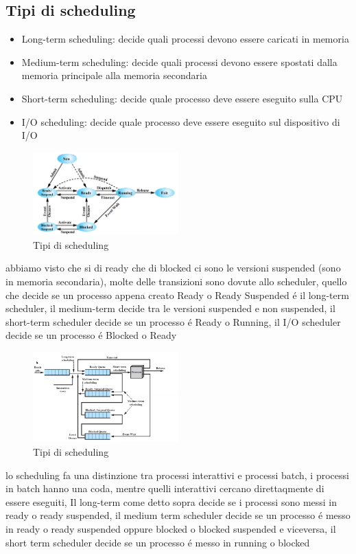 \documentclass[11pt]{article}
\begin{document}
    \subsection{Tipi di scheduling}
    \begin{itemize}
        \item Long-term scheduling: decide quali processi devono essere caricati in memoria
        \item Medium-term scheduling: decide quali processi devono essere spostati dalla memoria principale alla memoria secondaria
        \item Short-term scheduling: decide quale processo deve essere eseguito sulla CPU
        \item I/O scheduling: decide quale processo deve essere eseguito sul dispositivo di I/O
    \end{itemize}
    \begin{figure}[H]
        \centering
        \includegraphics[width=0.5\textwidth]{immagini/7State}
        \caption{Tipi di scheduling}
    \end{figure}
    abbiamo visto che si di ready che di blocked ci sono le versioni suspended (sono in memoria secondaria), molte
    delle transizioni sono dovute allo scheduler, quello che decide se un processo appena creato Ready o Ready Suspended
    é il long-term scheduler, il medium-term decide tra le versioni suspended e non suspended, il short-term scheduler
    decide se un processo é Ready o Running, il I/O scheduler decide se un processo é Blocked o Ready
    \begin{figure}[H]
        \centering
        \includegraphics[width=0.5\textwidth]{immagini/implementazioneScheduling}
        \caption{Tipi di scheduling}
    \end{figure}
    lo scheduling fa una distinzione tra processi interattivi e processi batch, i processi in batch hanno una coda, mentre
    quelli interattivi cercano direttaqmente di essere eseguiti, Il long-term come detto sopra decide se i processi sono
    messi in ready o ready suspended, il medium term scheduler decide se un processo é messo in ready o ready suspended
    oppure blocked o blocked suspended e viceversa, il short term scheduler decide se un processo é messo in running o blocked
\end{document}
